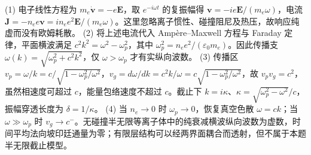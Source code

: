 (1) 电子线性方程为 \(m_e\dot{\mathbf v}=-e\mathbf E\)，取 \(e^{-i\omega t}\) 的复振幅得 \(\mathbf v=-i e\mathbf E/(m_e\omega)\)，电流 \(\mathbf J=-n_ee\mathbf v=i n_ee^2\mathbf E/(m_e\omega)\)。这里忽略离子惯性、碰撞阻尼及热压，故响应纯虚而没有欧姆耗散。
(2) 将上述电流代入 Ampère–Maxwell 方程与 Faraday 定律，平面横波满足 \(c^2k^2=\omega^2-\omega_p^2\)，其中 \(\omega_p^2=n_ee^2/(\varepsilon_0m_e)\)。因此传播支 \(\omega(k)=\sqrt{\omega_p^2+c^2k^2}\)，仅 \(\omega>\omega_p\) 才有实纵向波数。
(3) 传播区 \(v_p=\omega/k=c/\sqrt{1-\omega_p^2/\omega^2}\)，\(v_g=d\omega/dk=c^2k/\omega=c\sqrt{1-\omega_p^2/\omega^2}\)，故 \(v_pv_g=c^2\)，虽然相速度可超过 \(c\)，能量包络速度不超过 \(c\)。截止下 \(k=i\kappa\)、\(\kappa=\sqrt{\omega_p^2-\omega^2}/c\)，振幅穿透长度为 \(\delta=1/\kappa\)。
(4) 当 \(n_e\to0\) 时 \(\omega_p\to0\)，恢复真空色散 \(\omega=ck\)；当 \(\omega\gg\omega_p\) 时 \(v_g\to c^-\)。无碰撞半无限等离子体中的纯衰减横波纵向波数为虚数，时间平均法向坡印廷通量为零；有限层结构可以经两界面耦合而透射，但不属于本题半无限截止模型。
